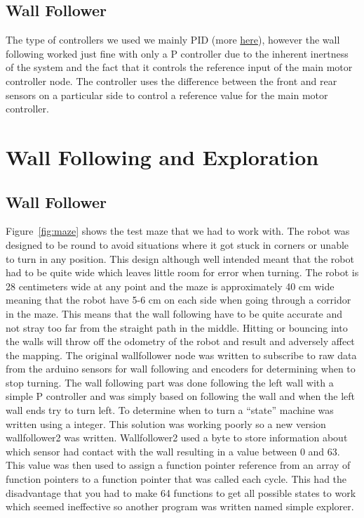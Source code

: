 \subsection{Wall Follower}
The type of controllers we used we mainly PID (more
\href{http://lmgtfy.com/?q=PID+tutorial}{here}), however the wall following
worked just fine with only a P controller due to the inherent inertness of the
system and the fact that it controls the reference input of the main motor
controller node. The controller uses the difference between the front and rear
sensors on a particular side to control a reference value for the main motor
controller.

\section{Wall Following and Exploration}
\subsection{Wall Follower}
\label{sec:wall}
Figure~\ref{fig:maze} shows the test maze that we had to work with. The robot
was designed to be round to avoid situations where it got stuck in corners or
unable to turn in any position. This design although well intended meant that
the robot had to be quite wide which leaves little room for error when turning.
The robot is 28 centimeters wide at any point and the maze is approximately 40
cm wide meaning that the robot have 5-6 cm on each side when going through a
corridor in the maze. This means that the wall following have to be quite
accurate and not stray too far from the straight path in the middle. Hitting or
bouncing into the walls will throw off the odometry of the robot and result and
adversely affect the mapping. The original wallfollower node was written to
subscribe to raw data from the arduino sensors for wall following and encoders
for determining when to stop turning. The wall following part was done following
the left wall with a simple P controller and was simply based on following the
wall and when the left wall ends try to turn left. To determine when to turn a
“state” machine was written using a integer. This solution was working poorly so
a new version wallfollower2 was written. Wallfollower2 used a byte to store
information about which sensor had contact with the wall resulting in a value
between 0 and 63. This value was then used to assign a function pointer
reference from an array of function pointers to a function pointer that was
called each cycle. This had the disadvantage that you had to make 64 functions
to get all possible states to work which seemed ineffective so another program
was written named simple explorer.

